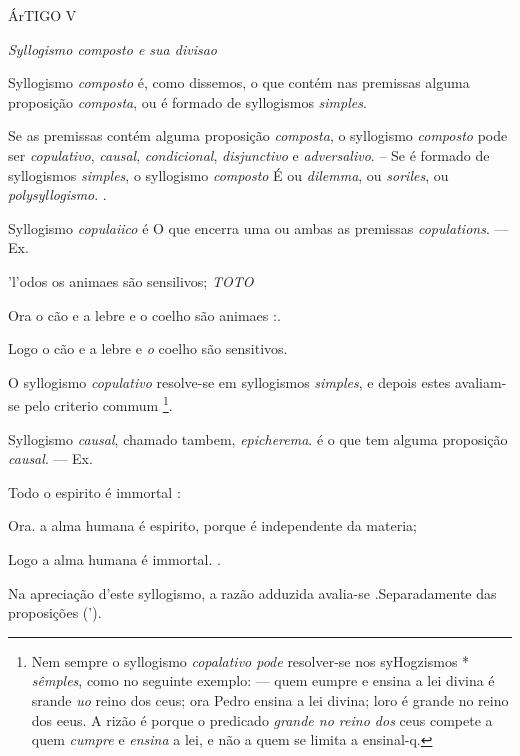 ÁrTIGO V

\emph{Syllogismo composto e sua divisao}


 
Syllogismo \emph{composto} é, como dissemos, o que contém nas premissas alguma proposição \emph{composta}, ou é formado de syllogismos \emph{simples}.


Se as premissas contém alguma proposição \emph{composta}, o syllogismo \emph{composto} pode ser \emph{copulativo}, \emph{causal}, \emph{condicional}, \emph{disjunctivo} e \emph{adversalivo}. --    Se é formado de syllogismos \emph{simples}, o syllogismo \emph{composto} É ou \emph{dilemma}, ou \emph{soriles}, ou \emph{polysyllogismo}. .


Syllogismo \emph{copulaiico} é O que encerra uma ou ambas as premissas \emph{copulations}. --- Ex.

'l'odos os animaes são sensilivos; \emph{TOTO}

Ora o cão e a lebre e o coelho são animaes :.

Logo o cão e a lebre e \emph{o} coelho são sensitivos.

O syllogismo \emph{copulativo} resolve-se em syllogismos \emph{simples}, e depois estes avaliam-se pelo criterio commum \footnote{Nem sempre o syllogismo \emph{copalativo pode} resolver-se nos syHogzismos * \emph{sêmples}, como no seguinte exemplo: --- quem eumpre e ensina a lei divina é srande \emph{uo} reino dos ceus; ora Pedro ensina a lei divina; loro é grande no reino dos eeus. A rizão é porque o predicado \emph{grande no reino dos} ceus compete a quem \emph{cumpre} e \emph{ensina} a lei, e não a quem se limita a ensinal-q.}.


 
Syllogismo \emph{causal}, chamado tambem, \emph{epicherema}. é o que tem alguma proposição \emph{causal}. --- Ex.

Todo o espirito é immortal :

Ora. a alma humana é espirito, porque é independente da materia;

Logo a alma humana é immortal. .

Na apreciação d'este syllogismo, a razão adduzida avalia-se .Separadamente das proposições (').

